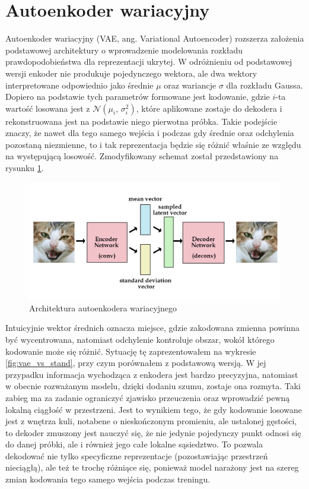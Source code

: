 \section{Autoenkoder wariacyjny} \label{sec:vae}

Autoenkoder wariacyjny (VAE, ang. Variational Autoencoder) rozszerza założenia podstawowej architektury o wprowadzenie modelowania rozkładu prawdopodobieństwa dla reprezentacji ukrytej. W odróżnieniu od podstawowej wersji enkoder nie produkuje pojedynczego wektora, ale dwa wektory interpretowane odpowiednio jako średnie $\mu$ oraz wariancje $\sigma$ dla rozkładu Gaussa. Dopiero na podstawie tych parametrów formowane jest kodowanie, gdzie $i$-ta wartość losowana jest z $\mathcal{N}(\mu_{i},\,\sigma_{i}^{2})$, które aplikowane zostaje do dekodera i rekonstruowana jest na podstawie niego pierwotna próbka. Takie podejście znaczy, że nawet dla tego samego wejścia i podczas gdy średnie oraz odchylenia pozostaną niezmienne, to i tak reprezentacja będzie się różnić właśnie ze względu na występującą losowość. Zmodyfikowany schemat został przedstawiony na rysunku \ref{fig:vae_model}.

\begin{figure}[h!]
    \centering
    \includegraphics[width=1.0\textwidth]{images/vae_model}
    \caption{Architektura autoenkodera wariacyjnego}
    \label{fig:vae_model}
\end{figure}

Intuicyjnie wektor średnich oznacza miejsce, gdzie zakodowana zmienna powinna być wycentrowana, natomiast odchylenie kontroluje obszar, wokół którego kodowanie może się różnić. Sytuację tę zaprezentowałem na wykresie \ref{fig:vae_vs_stand}, przy czym porównałem z podstawową wersją. W jej przypadku informacja wychodząca z enkodera jest bardzo precyzyjna, natomiast w obecnie rozważanym modelu, dzięki dodaniu szumu, zostaje ona rozmyta. Taki zabieg ma za zadanie ograniczyć zjawisko przeuczenia oraz wprowadzić pewną lokalną ciągłość w przestrzeni. Jest to wynikiem tego, że gdy kodowanie losowane jest z wnętrza kuli, notabene o nieskończonym promieniu, ale ustalonej gęstości, to dekoder zmuszony jest nauczyć się, że nie jedynie pojedynczy punkt odnosi się do danej próbki, ale i również jego całe lokalne sąsiedztwo. To pozwala dekodować nie tylko specyficzne reprezentacje (pozostawiając przestrzeń nieciągłą), ale też te trochę różniące się, ponieważ model narażony jest na szereg zmian kodowania tego samego wejścia podczas treningu.

